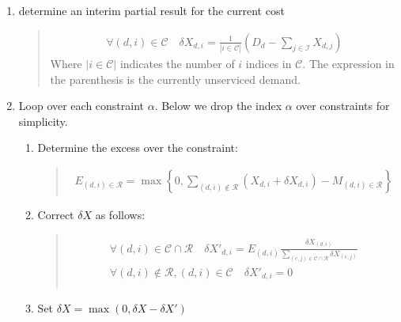 \documentclass[letterpaper,10pt,english]{sphinxmanual}
\begin{document}
\begin{fulllineitems}
\begin{enumerate}
\begin{enumerate}
\item {} 
determine an interim partial result for the current cost
\begin{quote}
\begin{equation*}
\begin{split}\forall (d, i) \in \mathcal{C}\quad
\delta X_{d, i} = \frac{1}{|i\in\mathcal{C}|}\left(
    D_d - \sum_{j \in \mathcal{I}} X_{d, j}\right)\end{split}
\end{equation*}
Where \(|i\in\mathcal{C}|\) indicates the number of \(i\) indices in
\(\mathcal{C}\). The expression in the parenthesis is the currently
unserviced demand.
\end{quote}

\item {} 
Loop over each constraint \(\alpha\). Below we drop the index
\(\alpha\) over constraints for simplicity.
\begin{enumerate}
%
\item {} 
Determine the excess over the constraint:
\begin{quote}
\begin{equation*}
\begin{split}E_{(d, i) \in \mathcal{R}} = \max\left\{
    0,
    \sum_{(d, i)\notin\mathcal{R}}\left(
        X_{d, i} + \delta X_{d, i}
    \right) - M_{(d, i) \in \mathcal{R}}
\right\}\end{split}
\end{equation*}\end{quote}

\item {} 
Correct \(\delta X\) as follows:
\begin{quote}
\begin{align*}\!\begin{aligned}
\forall (d, i) \in \mathcal{C}\cap\mathcal{R}\quad
\delta X\prime_{d, i} =
    E_{(d, i)}
    \frac{\delta X_{(d, i)}}{
        \sum_{(e, j)\in \mathcal{C}\cap\mathcal{R}} \delta X_{(e,j)}
    }\\
\forall (d, i) \notin \mathcal{R}, (d, i)\in\mathcal{C} \quad
\delta X\prime_{d, i} = 0\\
\end{aligned}\end{align*}\end{quote}

\item {} 
Set \(\delta X = \max(0, \delta X - \delta X\prime)\)


\end{enumerate}
\end{enumerate}
\end{enumerate}
\end{fulllineitems}
\end{document}
